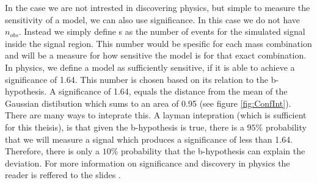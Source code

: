 In the case we are not intrested in discovering physics, but simple to measure the sensitivity of a model, we can also use 
significance. In this case we do not have $n_{obs}$. Instead we simply define s as the number of events for the simulated signal 
inside the signal region. This number would be spesific for each mass combination and will be a measure for how sensitive 
the model is for that exact combination. In physics, we define a model as sufficiently sensitive, if it is able to achieve a 
significance of 1.64. This number is chosen based on its relation to the b-hypothesis. A significance of 1.64, equals the 
distance from the mean of the Gaussian distibution which sums to an area of 0.95 (see figure \ref{fig:ConfInt}). There are many ways to inteprate this. A layman 
intepration (which is sufficient for this theisis), is that given the b-hypothesis is true, there is a $95\%$ probability that we will 
measure a signal which produces a significance of less than 1.64. Therefore, there is only a $10\%$ probability that the b-hypothesis
can explain the deviation. For more information on significance and discovery in physics the reader is reffered to the slides \cite{magnar}.

